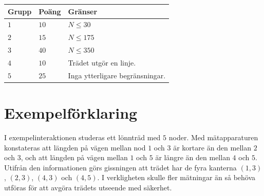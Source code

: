 \noindent
\begin{tabular}{| l | l | p{12cm} |}
  \hline
  \textbf{Grupp} & \textbf{Poäng} & \textbf{Gränser} \\ \hline
  $1$   & $10$       & $N \le 30$\\ \hline
  $2$   & $15$       & $N \le 175$  \\ \hline
  $3$   & $40$       & $N \le 350$ \\ \hline
  $4$   & $10$       & Trädet utgör en linje. \\ \hline
  $5$   & $25$       & Inga ytterligare begränsningar. \\ \hline
\end{tabular}

\section*{Exempelförklaring}
I exempelinteraktionen studeras ett lönnträd med $5$ noder.
Med mätapparaturen konstateras att längden på vägen mellan nod $1$ och $3$ är kortare än den mellan $2$ och $3$, och att längden på vägen mellan $1$ och $5$ är längre än den mellan $4$ och $5$.
Utifrån den informationen görs gissningen att trädet har de fyra kanterna $(1, 3)$, $(2, 3)$, $(4, 3)$ och $(4, 5)$.
I verkligheten skulle fler mätningar än så behöva utföras för att avgöra trädets utseende med säkerhet.
